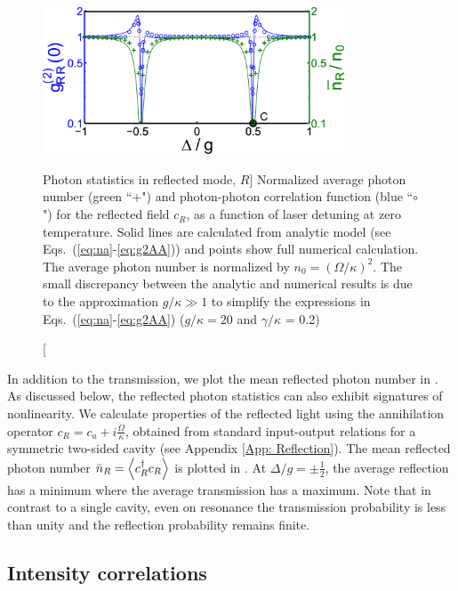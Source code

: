 \begin{figure}
\centering
  \includegraphics[width=0.8\textwidth]{./figs_Komar2013/fig2c.pdf}
  \caption
  [Photon statistics in reflected mode, $R$]
  {
  \label{fig:spectrum_c}
  Normalized average photon number (green ``$+$")
  and photon-photon correlation function (blue ``$\circ$")
  for the reflected field $c_R$,
  as a function of laser detuning at zero temperature.
  Solid lines are calculated from analytic model
  (see Eqs.~(\ref{eq:na}-\ref{eq:g2AA}))
  and points show full numerical calculation.
  The average photon number is
  normalized by $n_0 = (\Omega/\kappa)^2$.
  The
  small discrepancy between the analytic and numerical results is due to the
  approximation $g/\kappa \gg 1$   to  
  simplify the expressions in Eqs.~(\ref{eq:na}-\ref{eq:g2AA})
  ($g/\kappa = 20$ and $\gamma/\kappa$ = 0.2)
  }
\end{figure}
 


In addition to the transmission,
we plot the mean reflected photon number
in  .
As discussed below, the reflected 
photon statistics
can also exhibit signatures of
nonlinearity.
We  calculate properties of the reflected light
using the
annihilation operator 
$c_R = c_a + i\frac{\Omega}{\kappa}$, obtained from standard input-output relations
for a symmetric two-sided cavity (see Appendix
\ref{App: Reflection}).
The mean reflected photon number
$\bar n_R = \left< c_R^\dagger c_R \right>$
is plotted in .
At $\Delta/g = \pm \frac{1}{2}$, 
the average reflection has a minimum where the
average transmission has a maximum. 
Note that in contrast to a single cavity, 
even on resonance the transmission probability
is less than unity and the reflection probability
remains finite.



\subsection{Intensity correlations}
\label{sec:onetime_correlation}


